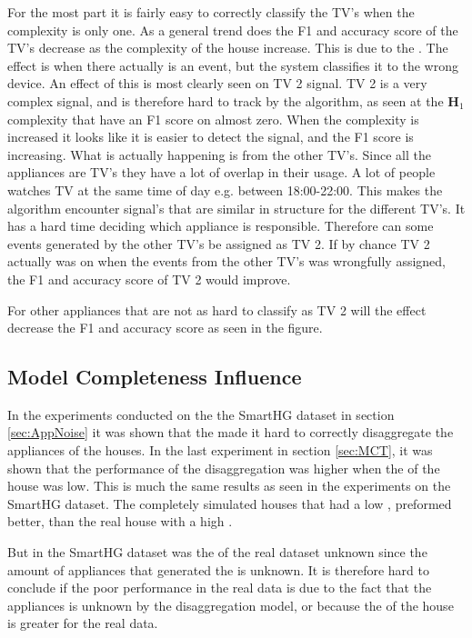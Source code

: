 For the most part it is fairly easy to correctly classify the TV's when the complexity is only one. As a general trend does the F1 and accuracy score of the TV's decrease as the complexity of the house increase. This is due to the . The  effect is when there actually is an event, but the system classifies it to the wrong device.  An effect of this is most clearly seen on TV 2 signal. TV 2 is a very complex signal, and is therefore hard to track by the algorithm, as seen at the $\textbf{H}_1$ complexity that have an F1 score on almost zero. When the complexity is increased it looks like it is easier to detect the signal, and the F1 score is increasing. What is actually happening is  from the other TV's. Since all the appliances are TV's they have a lot of overlap in their usage. A lot of people watches TV at the same time of day e.g. between 18:00-22:00. This makes the algorithm encounter signal's that are similar in structure for the different TV's. It has a hard time deciding which appliance is responsible. Therefore can some events generated by the other TV's be assigned as TV 2. If by chance TV 2 actually was on when the events from the other TV's was wrongfully assigned, the F1 and accuracy score of TV 2 would improve. 

For other appliances that are not as hard to classify as TV 2 will the  effect decrease the F1 and accuracy score as seen in the figure. 

\subsection{Model Completeness Influence }
In the experiments conducted on the the SmartHG dataset in section \ref{sec:AppNoise} it was shown that the  made it hard to correctly disaggregate the appliances of the houses. In the last experiment in section \ref{sec:MCT}, it was shown that the performance of the disaggregation was higher when the  of the house was low. This is much the same results as seen in the experiments on the SmartHG dataset. The completely simulated houses that had a low , preformed better, than the real house with a high . 

But in the SmartHG dataset was the  of the real dataset unknown since the amount of appliances that generated the  is unknown. It is therefore hard to conclude if the poor performance in the real data is due to the fact that the appliances is unknown by the disaggregation model, or because the  of the house is greater for the real data. 

